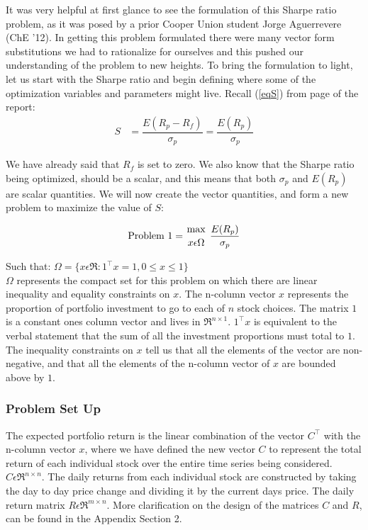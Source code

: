 
It was very helpful at first glance to see the formulation of this Sharpe ratio problem, as it was posed by a prior Cooper Union student Jorge Aguerrevere (ChE '12)\cite{back1}.  In getting this problem formulated there were many vector form substitutions we had to rationalize for ourselves and this pushed our understanding of the problem to new heights.  To bring the formulation to light, let us start with the Sharpe ratio and begin defining where some of the optimization variables and parameters might live.  Recall (\ref{eqS}) from page \pageref{eqS} of the report:
\begin{align*}
S &= \dfrac{E(R_p - R_f)}{\sigma_p}  =  \dfrac{E(R_p)}{\sigma_p}
\end{align*}

We have already said that $R_f$ is set to zero.  We also know that the Sharpe ratio being optimized, should be a scalar, and this means that both $\sigma_p$ and $E(R_p)$ are scalar quantities.  We will now create the vector quantities, and form a new problem to maximize the value of $S$:

\begin{equation}\label{eqProb1}
\text{Problem 1} = {{\mbox{max}}\atop{x\epsilon\Omega}} ~ \dfrac{E(R_p)}{\sigma_p}
\end{equation}

Such that: \indent\indent  $\Omega = \{ x\epsilon\Re : {1}^\top{x} = 1 , 0 \le x \le 1 \} $ \\[0.25cm]

$\Omega$ represents the compact set for this problem on which there are linear inequality and equality constraints on $x$.  The n-column vector $x$ represents the proportion of portfolio investment to go to each of $n$ stock choices.  The matrix ${1}$ is a constant ones column vector and lives in $\Re^{n\times 1}$.  ${1}^\top{x}$ is equivalent to the verbal statement that the sum of all the investment proportions must total to $1$.  The inequality constraints on $x$ tell us that all the elements of the vector are non-negative, and that all the elements of the n-column vector of $x$ are bounded above by $1$.

\subsubsection{Problem Set Up}
The expected portfolio return is the linear combination of the vector ${C}^\top$ with the n-column vector $x$, where we have defined the new vector $C$ to represent the total return of each individual stock over the entire time series being considered.  $C\epsilon\Re^{n\times n}$.  The daily returns from each individual stock are constructed by taking the day to day price change and dividing it by the current days price.  The daily return matrix $R\epsilon\Re^{m\times n}$.  More clarification on the design of the matrices $C$ and $R$, can be found in the Appendix Section 2. 


